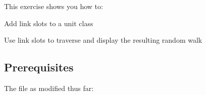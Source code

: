 \documentclass[10pt,twoside,english,pdftex]{article}
\begin{document}
\fndocrule

This exercise shows you how to:
\begin{tightitemize}
\item Add link slots to a unit class
\item Use link slots to traverse and display the resulting random walk
\end{tightitemize}

\fndocrule

\subsection*{Prerequisites}

\begin{tightitemize}
\item The  file as modified thus far:
\end{tightitemize}
%
\W\supp
\end{document}
